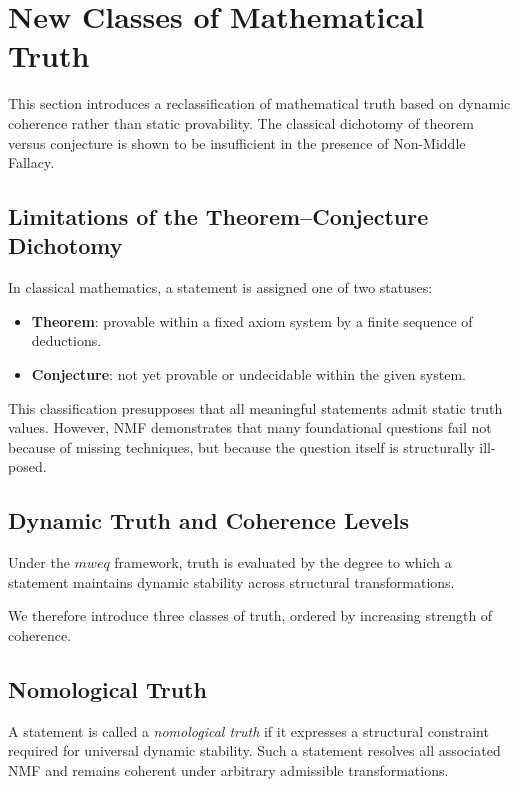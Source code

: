 \documentclass[11pt]{article}
\begin{document}
\section{New Classes of Mathematical Truth}

This section introduces a reclassification of mathematical truth based
on dynamic coherence rather than static provability.
The classical dichotomy of theorem versus conjecture is shown to be
insufficient in the presence of Non-Middle Fallacy.

\subsection{Limitations of the Theorem--Conjecture Dichotomy}

In classical mathematics, a statement is assigned one of two statuses:

\begin{itemize}
  \item \textbf{Theorem}: provable within a fixed axiom system by a
  finite sequence of deductions.
  \item \textbf{Conjecture}: not yet provable or undecidable within the
  given system.
\end{itemize}

This classification presupposes that all meaningful statements admit
static truth values.
However, NMF demonstrates that many foundational questions fail not
because of missing techniques, but because the question itself is
structurally ill-posed.

\subsection{Dynamic Truth and Coherence Levels}

Under the $mweq$ framework, truth is evaluated by the degree to which a
statement maintains dynamic stability across structural transformations.

We therefore introduce three classes of truth, ordered by increasing
strength of coherence.

\subsection{Nomological Truth}

\begin{definition}
A statement is called a \emph{nomological truth} if it expresses a
structural constraint required for universal dynamic stability.
Such a statement resolves all associated NMF and remains coherent
under arbitrary admissible transformations.
\end{definition}
\end{document}
